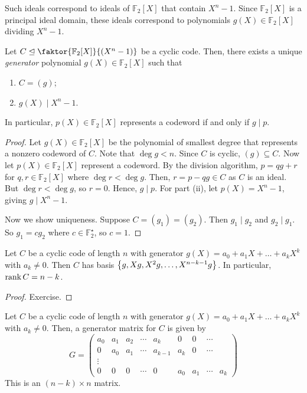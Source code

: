 Such ideals correspond to ideals of \( \mathbb F_2[X] \) that contain \( X^n - 1 \).
Since \( \mathbb F_2[X] \) is a principal ideal domain, these ideals correspond to polynomials \( g(X) \in \mathbb F_2[X] \) dividing \( X^n - 1 \).
\begin{theorem}
    Let \( C \trianglelefteq \faktor{\mathbb F_2[X]}{(X^n - 1)} \) be a cyclic code.
    Then, there exists a unique \emph{generator} polynomial \( g(X) \in \mathbb F_2[X] \) such that
    \begin{enumerate}
        \item \( C = (g) \);
        \item \( g(X) \mid X^n - 1 \).
    \end{enumerate}
    In particular, \( p(X) \in \mathbb F_2[X] \) represents a codeword if and only if \( g \mid p \).
\end{theorem}
\begin{proof}
    Let \( g(X) \in \mathbb F_2[X] \) be the polynomial of smallest degree that represents a nonzero codeword of \( C \).
    Note that \( \deg g < n \).
    Since \( C \) is cyclic, \( (g) \subseteq C \).
    Now let \( p(X) \in \mathbb F_2[X] \) represent a codeword.
    By the division algorithm, \( p = qg + r \) for \( q, r \in \mathbb F_2[X] \) where \( \deg r < \deg g \).
    Then, \( r = p - qg \in C \) as \( C \) is an ideal.
    But \( \deg r < \deg g \), so \( r = 0 \).
    Hence, \( g \mid p \).
    For part (ii), let \( p(X) = X^n - 1 \), giving \( g \mid X^n - 1 \).

    Now we show uniqueness.
    Suppose \( C = (g_1) = (g_2) \).
    Then \( g_1 \mid g_2 \) and \( g_2 \mid g_1 \).
    So \( g_1 = cg_2 \) where \( c \in \mathbb F_2^\star \), so \( c = 1 \).
\end{proof}
\begin{lemma}
    Let \( C \) be a cyclic code of length \( n \) with generator \( g(X) = a_0 + a_1 X + \dots + a_k X^k \) with \( a_k \neq 0 \).
    Then \( C \) has basis \( \qty{g, Xg, X^2g, \dots, X^{n-k-1}g} \).
    In particular, \( \rank C = n - k \).
\end{lemma}
\begin{proof}
    Exercise.
\end{proof}
\begin{corollary}
    Let \( C \) be a cyclic code of length \( n \) with generator \( g(X) = a_0 + a_1 X + \dots + a_k X^k \) with \( a_k \neq 0 \).
    Then, a generator matrix for \( C \) is given by
    \[ G = \begin{pmatrix}
        a_0 & a_1 & a_2 & \cdots & a_k & 0 & 0 & \cdots \\
        0 & a_0 & a_1 & \cdots & a_{k-1} & a_k & 0 & \cdots \\
        \vdots\\
        0 & 0 & 0 & \cdots & 0 & a_0 & a_1 & \cdots & a_k
    \end{pmatrix} \]
    This is an \( (n - k) \times n \) matrix.
\end{corollary}
